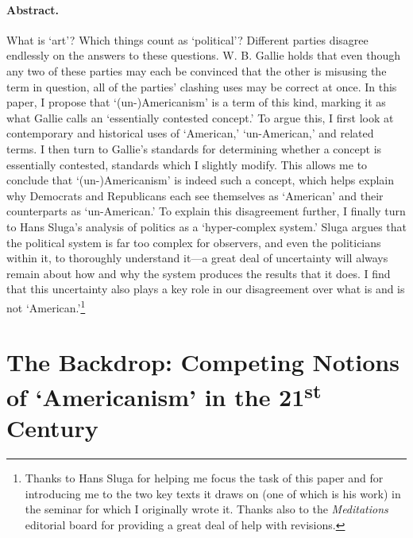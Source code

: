 \paragraph{\small Abstract.}

{
\footnotesize
What is `art'? Which things count as `political'? Different parties
disagree endlessly on the answers to these questions. W. B. Gallie holds
that even though any two of these parties may each be convinced that the
other is misusing the term in question, all of the parties' clashing
uses may be correct at once. In this paper, I propose that
`(un-)Americanism' is a term of this kind, marking it as what Gallie
calls an `essentially contested concept.' To argue this, I first look at
contemporary and historical uses of `American,' `un-American,' and
related terms. I then turn to Gallie's standards for determining whether
a concept is essentially contested, standards which I slightly modify.
This allows me to conclude that `(un-)Americanism' is indeed such a
concept, which helps explain why Democrats and Republicans each see
themselves as `American' and their counterparts as `un-American.' To
explain this disagreement further, I finally turn to Hans Sluga's
analysis of politics as a `hyper-complex system.' Sluga argues that the
political system is far too complex for observers, and even the
politicians within it, to thoroughly understand it---a great deal of
uncertainty will always remain about how and why the system produces the
results that it does. I find that this uncertainty also plays a key role
in our disagreement over what is and is not `American.'\footnote{Thanks to Hans Sluga for helping me focus the task of
  this paper and for introducing me to the two key texts it draws on
  (one of which is his work) in the seminar for which I originally wrote
  it. Thanks also to the \emph{Meditations} editorial board for
  providing a great deal of help with revisions.}
}

\section{The Backdrop: Competing Notions of `Americanism' in the
21\textsuperscript{st} Century}

